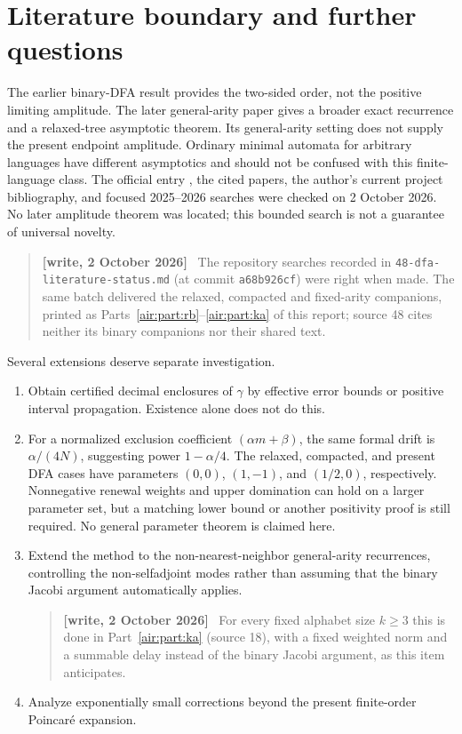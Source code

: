 \documentclass[11pt,letterpaper]{article}
\numberwithin{equation}{section}
\theoremstyle{remark}
\newenvironment{writenote}{\par\smallskip\begin{quote}\small\textbf{[write, 2 October 2026]}\ }{\end{quote}\smallskip}
\newcommand{\repopath}[1]{\nolinkurl{#1}}
\begin{document}
\section{Literature boundary and further questions}\label{air:dfa:sec:questions}
The earlier binary-DFA result \cite{dfa} provides the two-sided order,
not the positive limiting amplitude. The later general-arity paper
\cite{gdw} gives a broader exact recurrence and a relaxed-tree asymptotic
theorem. Its general-arity setting does not supply the present endpoint
amplitude. Ordinary minimal automata for arbitrary languages have different
asymptotics and should not be confused with this finite-language class.
The official entry \cite{oeis}, the cited papers, the author's current
project bibliography, and focused 2025--2026 searches were checked on
2 October 2026. No later amplitude theorem was located; this bounded
search is not a guarantee of universal novelty.
\begin{writenote}
The repository searches recorded in \repopath{48-dfa-literature-status.md} (at commit \texttt{a68b926cf}) were right when made. The same batch delivered the relaxed, compacted and fixed-arity companions, printed as Parts~\ref{air:part:rb}--\ref{air:part:ka} of this report; source 48 cites neither its binary companions nor their shared text.
\end{writenote}


Several extensions deserve separate investigation.
\begin{enumerate}
\item Obtain certified decimal enclosures of $\gamma$ by effective error
bounds or positive interval propagation. Existence alone does not do this.
\item For a normalized exclusion coefficient $(\alpha m+\beta)$, the same
formal drift is $\alpha/(4N)$, suggesting power $1-\alpha/4$.
The relaxed, compacted, and present DFA cases have parameters
$(0,0)$, $(1,-1)$, and $(1/2,0)$, respectively. Nonnegative renewal
weights and upper domination can hold on a larger parameter set, but a
matching lower bound or another positivity proof is still required.
No general parameter theorem is claimed here.
\item Extend the method to the non-nearest-neighbor general-arity
recurrences, controlling the non-selfadjoint modes rather than assuming
that the binary Jacobi argument automatically applies.
\begin{writenote}
For every fixed alphabet size $k\ge3$ this is done in Part~\ref{air:part:ka} (source 18), with a fixed weighted norm and a summable delay instead of the binary Jacobi argument, as this item anticipates.
\end{writenote}

\item Analyze exponentially small corrections beyond the present
finite-order Poincar\'e expansion.
\end{enumerate}
\end{document}
